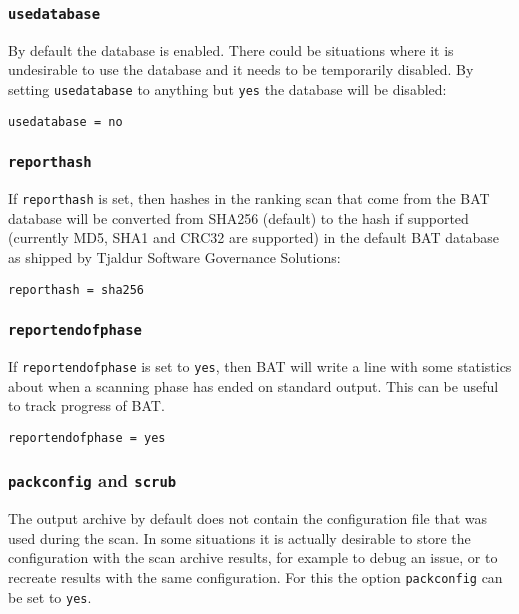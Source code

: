\documentclass[10pt,a4paper]{article}
\begin{document}
\subsubsection{\texttt{usedatabase}}

By default the database is enabled. There could be situations where it is
undesirable to use the database and it needs to be temporarily disabled. By
setting \texttt{usedatabase} to anything but \texttt{yes} the database will
be disabled:

\begin{verbatim}
usedatabase = no
\end{verbatim}

\subsubsection{\texttt{reporthash}}

If \texttt{reporthash} is set, then hashes in the ranking scan that come from
the BAT database will be converted from SHA256 (default) to the hash if
supported (currently MD5, SHA1 and CRC32 are supported) in the default BAT
database as shipped by Tjaldur Software Governance Solutions:

\begin{verbatim}
reporthash = sha256
\end{verbatim}

\subsubsection{\texttt{reportendofphase}}

If \texttt{reportendofphase} is set to \texttt{yes}, then BAT will write a
line with some statistics about when a scanning phase has ended on standard
output. This can be useful to track progress of BAT.

\begin{verbatim}
reportendofphase = yes
\end{verbatim}

\subsubsection{\texttt{packconfig} and \texttt{scrub}}

The output archive by default does not contain the configuration file that was
used during the scan. In some situations it is actually desirable to store the
configuration with the scan archive results, for example to debug an issue, or
to recreate results with the same configuration. For this the option
\texttt{packconfig} can be set to \texttt{yes}.
\end{document}
